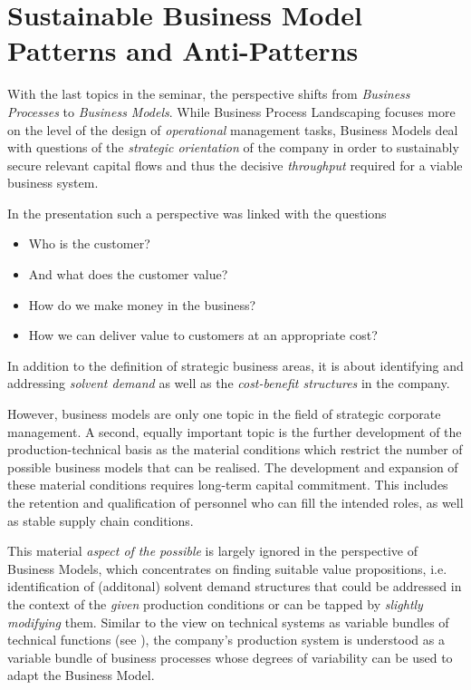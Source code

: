 \documentclass[11pt,a4paper]{article}
\begin{document}
\section{Sustainable Business Model Patterns and Anti-Patterns}

With the last topics in the seminar, the perspective shifts from
\emph{Business Processes} to \emph{Business Models}. While Business Process
Landscaping focuses more on the level of the design of \emph{operational}
management tasks, Business Models deal with questions of the \emph{strategic
  orientation} of the company in order to sustainably secure relevant capital
flows and thus the decisive \emph{throughput} required for a viable business
system.
\newpage

In the presentation such a perspective was linked with the questions
\begin{itemize}
\item Who is the customer?
\item And what does the customer value?
\item How do we make money in the business?
\item How we can deliver value to customers at an appropriate cost?
\end{itemize}
In addition to the definition of strategic business areas, it is about
identifying and addressing \emph{solvent demand} as well as the
\emph{cost-benefit structures} in the company.

However, business models are only one topic in the field of strategic
corporate management. A second, equally important topic is the further
development of the production-technical basis as the material conditions which
restrict the number of possible business models that can be realised. The
development and expansion of these material conditions requires long-term
capital commitment. This includes the retention and qualification of personnel
who can fill the intended roles, as well as stable supply chain conditions.

This material \emph{aspect of the possible} is largely ignored in the
perspective of Business Models, which concentrates on finding suitable value
propositions, i.e. identification of (additonal) solvent demand structures
that could be addressed in the context of the \emph{given} production
conditions or can be tapped by \emph{slightly modifying} them. Similar to the
view on technical systems as variable bundles of technical functions (see
\cite{Graebe-dat}), the company's production system is understood as a
variable bundle of business processes whose degrees of variability can be used
to adapt the Business Model.
\end{document}
